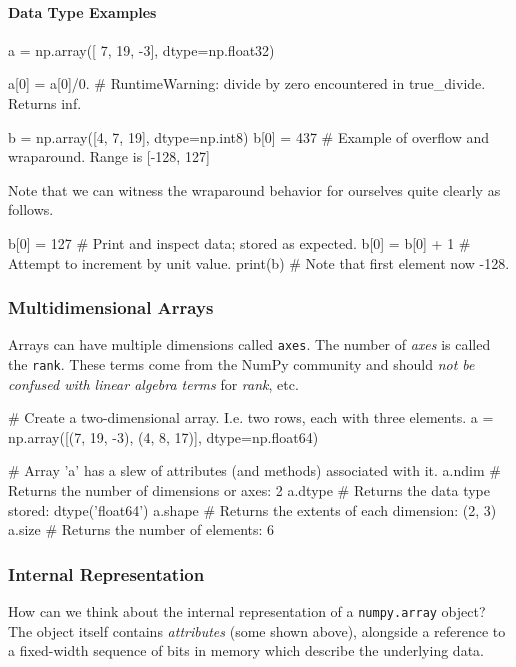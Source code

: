 \documentclass[12pt,letterpaper,twoside]{article}
\begin{document}
\paragraph{Data Type Examples}
\begin{python}
a = np.array([ 7, 19, -3], dtype=np.float32)

a[0] = a[0]/0.     # RuntimeWarning: divide by zero encountered in true_divide. Returns inf.

b = np.array([4, 7, 19], dtype=np.int8)
b[0] = 437         # Example of overflow and wraparound. Range is [-128, 127]
\end{python}

Note that we can witness the wraparound behavior for ourselves quite
clearly as follows.

\begin{python}
  b[0] = 127       # Print and inspect data; stored as expected.
  b[0] = b[0] + 1  # Attempt to increment by unit value.
  print(b)         # Note that first element now -128.
\end{python}

\subsubsection{Multidimensional Arrays}
Arrays can have multiple dimensions called \texttt{axes}.
The number of \emph{axes} is called the \texttt{rank}.
These terms come from the NumPy community and should \emph{not be confused
with linear algebra terms} for \emph{rank}, etc.

\begin{python}
# Create a two-dimensional array. I.e. two rows, each with three elements.
a = np.array([(7, 19, -3), (4, 8, 17)], dtype=np.float64)

# Array 'a' has a slew of attributes (and methods) associated with it.
a.ndim      # Returns the number of dimensions or axes: 2
a.dtype     # Returns the data type stored:             dtype('float64')
a.shape     # Returns the extents of each dimension:    (2, 3)
a.size      # Returns the number of elements:           6
\end{python}

\subsubsection{Internal Representation}
How can we think about the internal representation of a
\texttt{numpy.array} object? The object itself contains
\emph{attributes} (some shown above), alongside a reference to a
fixed-width sequence of bits in memory which describe the underlying data.
\end{document}
